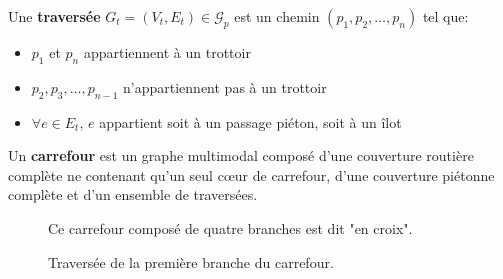 \begin{definition}
    Une \textbf{traversée} $G_{t} = (V_{t}, E_{t}) \in \mathcal{G}_p$ est un chemin $(p_1, p_2,\dots, p_n)$ tel que:

    \begin{itemize}
        \item $p_1$ et $p_n$ appartiennent à un trottoir
        \item $p_2, p_3, \dots, p_{n-1}$ n'appartiennent pas à un trottoir
        \item $\forall e \in E_t$, $e$ appartient soit à un passage piéton, soit à un îlot
    \end{itemize}
\end{definition}

\begin{definition}
    Un \textbf{carrefour} est un graphe multimodal composé d'une couverture routière complète ne contenant qu'un seul cœur de carrefour, d'une couverture piétonne complète et d'un ensemble de traversées.
\end{definition}

\begin{figure}
    \centering
    \caption{Ce carrefour composé de quatre branches est dit "en croix".}
    \label{fig:modelisation_branche}
\end{figure}

\begin{figure}
    \centering
    \caption{Traversée de la première branche du carrefour.}
    \label{fig:modelisation_traversee}
\end{figure}

